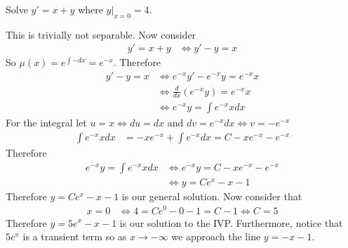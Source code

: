 \documentclass[notes]{subfiles}
\begin{document}
\begin{exercise}
    Solve $y' = x + y$ where $y|_{x = 0} = 4$.
\end{exercise}
\begin{solution}
    This is trivially not separable. Now consider
    \begin{align*}
        y' = x + y
        &\iff y' - y = x
    \end{align*}
    So $\mu(x) = e^{\int -dx} = e^{-x}$. Therefore
    \begin{align*}
        y' - y = x
        &\iff e^{-x}y' - e^{-x}y = e^{-x}x \\
        &\iff \frac{d}{dx}(e^{-x}y) = e^{-x}x \\
        &\iff e^{-x}y = \int e^{-x}x dx
    \end{align*}
    For the integral let $u = x \iff du = dx$ and $dv = e^{-x}dx \iff v = -e^{-x}$
    \begin{align*}
        \int e^{-x}x dx
        &= -x e^{-x} + \int e^{-x}dx
        = C - x e^{-x} - e^{-x}
    \end{align*}
    Therefore
    \begin{align*}
        e^{-x}y = \int e^{-x}x dx
        &\iff e^{-x}y = C - x e^{-x} - e^{-x} \\
        &\iff y = Ce^x - x - 1
    \end{align*}
    Therefore $y = Ce^x - x - 1$ is our general solution. Now consider that
    \begin{align*}
        x = 0
        &\iff 4 = Ce^{0} - 0 - 1 = C - 1
        \iff C = 5
    \end{align*}
    Therefore $y = 5e^x - x - 1$ is our solution to the IVP. Furthermore, notice that $5e^x$ is a transient term so as $x \to -\infty$ we approach the line $y = -x - 1$.
\end{solution}
\end{document}
